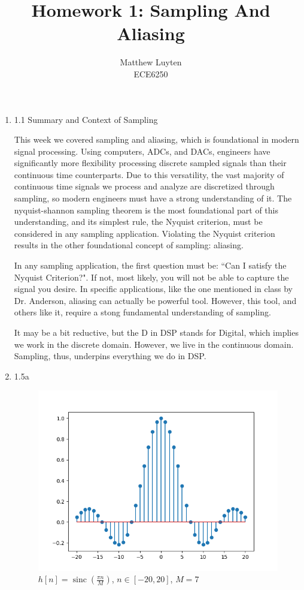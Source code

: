 \documentclass[12pt]{article}
\DeclareMathOperator{\sinc}{sinc}
\begin{document}
 
\title{Homework 1: Sampling And Aliasing}
\author{Matthew Luyten\\ %
ECE6250}

\maketitle

\begin{enumerate} 
\item[] 1.1 Summary and Context of Sampling

This week we covered sampling and aliasing, which is foundational in modern signal processing. 
Using computers, ADCs, and DACs, engineers have significantly more flexibility processing discrete 
sampled signals than their continuous time counterparts. Due to this versatility, the vast majority of 
continuous time signals we process and analyze are discretized through sampling, so modern engineers 
must have a strong understanding of it. The nyquist-shannon sampling theorem is the most 
foundational part of this understanding, and its simplest rule, the Nyquist criterion, must be 
considered in any sampling application. Violating the Nyquist criterion results in the other 
foundational concept of sampling: aliasing.

In any sampling application, the first question must be: “Can I satisfy the Nyquist Criterion?". If not,
most likely, you will not be able to capture the signal you desire. In specific applications, like the
one mentioned in class by Dr. Anderson, aliasing can actually be powerful tool. However, this tool, and 
others like it, require a stong fundamental understanding of sampling.

It may be a bit reductive, but the D in DSP stands for Digital, which implies we work in the discrete domain.
However, we live in the continuous domain. Sampling, thus, underpins everything we do in DSP.

\newpage

\item[] 1.5a

\begin{figure}[h]
    \caption{$h[n]=\sinc(\frac{\pi n}{M})$, $n\in[-20,20]$, $M=7$}
    \centering
    \includegraphics[scale=0.6]{1-5a.png}
\end{figure}


\end{enumerate}
\end{document}
